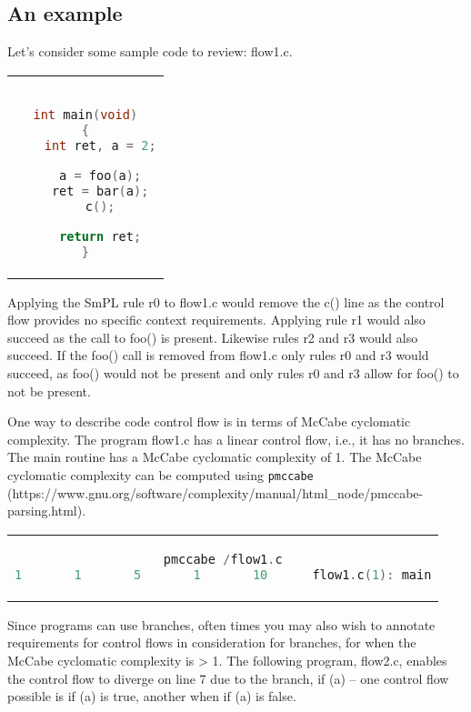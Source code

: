 \subsection{An example}
Let's consider some sample code to review: flow1.c.

\begin{center}
\begin{tabular}{c}
\begin{lstlisting}[language=C]

int main(void)
{
	int ret, a = 2;

	a = foo(a);
	ret = bar(a);
	c();

	return ret;
}
\end{lstlisting}\\
\end{tabular}
\end{center}

Applying the SmPL rule r0 to flow1.c would remove the c() line as the control
flow provides no specific context requirements. Applying rule r1 would also
succeed as the call to foo() is present. Likewise rules r2 and r3 would also
succeed. If the foo() call is removed from flow1.c only rules r0 and r3 would
succeed, as foo() would not be present and only rules r0 and r3 allow for
foo() to not be present.

One way to describe code control flow is in terms of McCabe cyclomatic
complexity.
The program flow1.c has a linear control flow, i.e., it has no
branches. The main
routine has a McCabe cyclomatic complexity of 1. The McCabe cyclomatic
complexity can be computed using
{\tt pmccabe} (https://www.gnu.org/\-software/\-complexity/\-manual/\-html\_node/\-pmccabe-parsing.html).

\begin{center}
\begin{tabular}{c}
\begin{lstlisting}[language=C]
pmccabe /flow1.c
1       1       5       1       10      flow1.c(1): main
\end{lstlisting}\\
\end{tabular}
\end{center}

Since programs can use branches, often times you may also wish to annotate
requirements for control flows in consideration for branches, for when
the McCabe cyclomatic complexity is > 1. The following program, flow2.c,
enables the control flow to diverge on line 7 due to the branch, if (a) --
one control flow possible is if (a) is true, another when if (a) is false.

